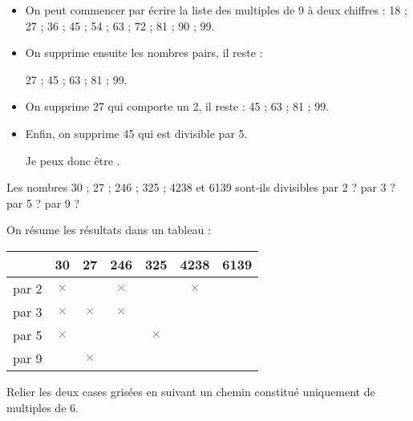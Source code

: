 \begin{Maquette}[Fiche,CorrigeFin,Colonnes=2]{}
\begin{multicols}{2}
      \begin{Solution}
         \begin{itemize}
            \item On peut commencer par écrire la liste des multiples de 9 à deux chiffres : 18 ; 27 ; 36 ; 45 ; 54 ; 63 ; 72 ; 81 ; 90 ; 99.
            \item On supprime ensuite les nombres pairs, il reste : \par
               27 ; 45 ; 63 ; 81 ; 99.
            \item On supprime 27 qui comporte un 2, il reste : 45 ; 63 ; 81 ; 99.
            \item Enfin, on supprime 45 qui est divisible par 5. \par
               Je peux donc être .
         \end{itemize}
      \end{Solution}
      
      
      \begin{exercice} %
         Les nombres 30 ; 27 ; 246 ; 325 ; \num{4238} et \num{6139} sont-ils divisibles par 2 ? par 3 ? par 5 ? par 9 ?
      \end{exercice}
      \begin{Solution}
         On résume les résultats dans un tableau : \par \smallskip
         {
         \begin{tabular}{|*{7}{c|}}
            \hline
            & 30 & 27 & 246 & 325 & \num{4238} & \num{6139} \\
            \hline
            par 2 & \textcolor{RoyalBlue}{$\times$} & & \textcolor{RoyalBlue}{$\times$} & & \textcolor{RoyalBlue}{$\times$} & \\
            \hline
            par 3 & \textcolor{RoyalBlue}{$\times$} & \textcolor{RoyalBlue}{$\times$} & \textcolor{RoyalBlue}{$\times$} & & & \\
            \hline
            par 5 & \textcolor{RoyalBlue}{$\times$} & & & \textcolor{RoyalBlue}{$\times$} & & \\
            \hline
            par 9 & & \textcolor{RoyalBlue}{$\times$} & & & & \\
            \hline
         \end{tabular}}
      \end{Solution}
      
      
      \begin{exercice} %
         Relier les deux cases grisées en suivant un chemin constitué uniquement de multiples de 6. \par \smallskip
         \LabyNombre[Nom=Ex7,Graine=1,Multiple=6,Couleur=LightGrey,Echelle=1.1]
      \end{exercice}


\end{multicols}
\end{Maquette}
